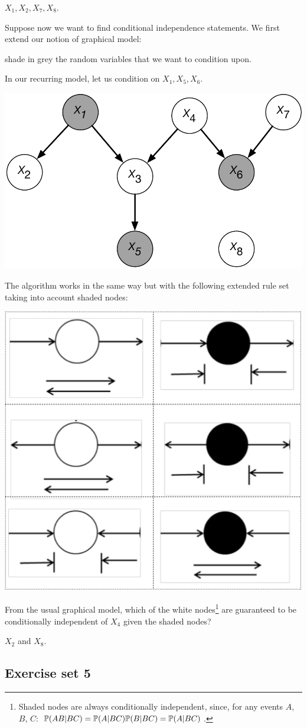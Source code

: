 \documentclass{article}
\begin{document}
 $X_1, X_2, X_7, X_8$.

 Suppose now we want to find conditional independence statements. We first extend our notion of graphical model:

 shade in grey the random variables that we want to condition upon.

 In our recurring model, let us condition on $X_1, X_5, X_6$.
\begin{center}
	\includegraphics[width=0.5\linewidth]{figures/graph-model-cond} 
\end{center}

 The algorithm works in the same way but with the following extended rule set taking into account shaded nodes:
\begin{center}
	\includegraphics[width=0.4\linewidth]{figures/bayes-ball-full-rules} 
\end{center}

 From the usual graphical model, which of the white nodes\footnote{Shaded nodes are always conditionally independent, since, for any events $A$, $B$, $C$: $\P(AB|BC) = \P(A|BC)\P(B|BC) = \P(A|BC)$.} are guaranteed to be conditionally independent of $X_4$ given the shaded nodes?

 $X_2$ and $X_8$.


\subsection{Exercise set 5}
\end{document}
